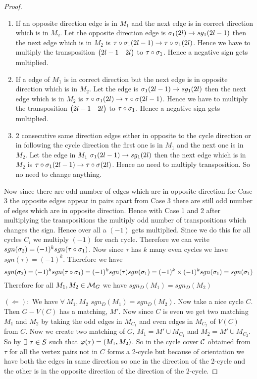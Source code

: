 \begin{proof}
	\begin{enumerate}[label=\bfseries Case \arabic*:,itemindent=2cm,leftmargin=0cm]
		\item If an opposite direction edge is in $M_1$ and the next edge is in correct direction which is in $M_2$. Let the opposite direction edge is $\sigma_1(2l)\to sg_1(2l-1)$ then the next edge which is in $M_2$ is $\tau\circ\sigma_1(2l-1)\to\tau\circ \sigma_1(2l)$. Hence we have to multiply the transposition $\left(\begin{matrix}2l-1& 2l\end{matrix}\right)$ to $\tau\circ\sigma_1$. Hence a negative sign gets multiplied.
		\item If a edge of $M_1$ is in correct direction but the next edge is in opposite direction which is in $M_2$. Let the  edge is $\sigma_1(2l-1)\to sg_1(2l)$ then the next edge which is in $M_2$ is $\tau\circ \sigma_1(2l)\to \tau\circ\sigma(2l-1)$. Hence we have to multiply the transposition $\left(\begin{matrix}2l-1& 2l\end{matrix}\right)$ to $\tau\circ\sigma_1$. Hence a negative sign gets multiplied.
		\item 2 consecutive same direction edges either in opposite to the cycle direction or in following the cycle direction the first one is in $M_1$ and the next one is in $M_2$. Let the edge in $M_1$ $\sigma_1(2l-1)\to sg_1(2l)$ then the next edge which is in $M_2$ is $\tau\circ \sigma_1(2l-1)\to \tau\circ\sigma(2l)$. Hence no need to multiply transposition. So no need to change anything.
	\end{enumerate}
Now since there are odd number of edges which are in opposite direction for Case 3 the opposite edges appear in pairs apart from Case 3 there are still odd number of edges which are in opposite direction. Hence with Case 1 and 2 after multiplying the transpositions the multiply odd number of transpositions which changes the sign. Hence over all a $(-1)$ gets multiplied. Since we do this for all cycles $C_i$ we multiply $(-1)$ for each cycle. Therefore we can write $sgn(\sigma_2)=(-1)^ksgn(\tau\circ \sigma_1)$. Now since $\tau$ has $k$ many even cycles we have $sgn(\tau)=(-1)^k$. Therefore we have $$sgn(\sigma_2)=(-1)^ksgn(\tau\circ \sigma_1)=(-1)^ksgn(\tau)sgn(\sigma_1)=(-1)^k\times (-1)^k sgn(\sigma_1)=sgn(\sigma_1)$$Therefore for all $M_1,M_2\in\mathcal{M}_G$ we have $sgn_D(M_1)=sgn_D(M_2)$

$(\Leftarrow):$ We have $\forall \ M_1,M_2$ $sgn_D(M_1)=sgn_D(M_2)$. Now take a nice cycle $C$. Then $G-V(C)$ has a matching, $M'$. Now since $C$ is even we get two matching $M_1$ and $M_2$ by taking the odd edges in $M_{C_1}$ and even edges in $M_{C_2}$ of $V(C)$ from $C$. Now we create two matching of $G$, $M_1=M'\cup M_{C_1}$ and $M_2=M'\cup M_{C_2}$. So by  $\exists\ \tau\in S$ such that $\varphi(\tau)=(M_1,M_2)$. So in the cycle cover $\mathcal{C}$ obtained from $\tau$ for all the vertex pairs not in $C$ forms a 2-cycle but because of orientation we have both the edges in same direction so one in the direction of the 2-cycle and the other is in the opposite direction of the direction of the 2-cycle. 


\end{proof}
